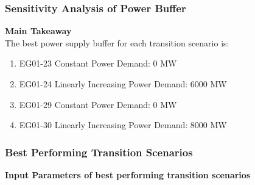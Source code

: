 \begin{frame}
\frametitle{Sensitivity Analysis of Power Buffer}
\textbf{Main Takeaway}
\\
The best power supply buffer for each transition scenario is: 
\begin{enumerate}
\item EG01-23 Constant Power Demand: 0 MW
\item EG01-24 Linearly Increasing Power Demand: 6000 MW
\item EG01-29 Constant Power Demand: 0 MW
\item EG01-30 Linearly Increasing Power Demand: 8000 MW 
\end{enumerate}
\end{frame}

\begin{frame}
\frametitle{Best Performing Transition Scenarios}
\textbf{Input Parameters of best performing transition scenarios}
\begin{table}[]
\end{table}
\end{frame}
